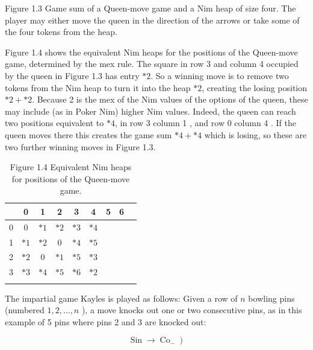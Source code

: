 \documentclass[12pt]{article}
\begin{document}
Figure 1.3 Game sum of a Queen-move game and a Nim heap of size four. The player may either move the queen in the direction of the arrows or take some of the four tokens from the heap.

Figure 1.4 shows the equivalent Nim heaps for the positions of the Queen-move game, determined by the mex rule. The square in row 3 and column 4 occupied by the queen in Figure 1.3 has entry $* 2$. So a winning move is to remove two tokens from the Nim heap to turn it into the heap $* 2$, creating the losing position $* 2+* 2$. Because 2 is the mex of the Nim values of the options of the queen, these may include (as in Poker Nim) higher Nim values. Indeed, the queen can reach two positions equivalent to $* 4$, in row 3 column 1 , and row 0 column 4 . If the queen moves there this creates the game sum $* 4+* 4$ which is losing, so these are two further winning moves in Figure 1.3.

\begin{table}[h]
\begin{center}
\begin{tabular}{l|c|c|c|c|c|c|c|l}
 & \multicolumn{1}{c}{0} & \multicolumn{1}{c}{1} & \multicolumn{1}{c}{2} & \multicolumn{1}{c}{3} & \multicolumn{1}{c}{4} & \multicolumn{1}{c}{5} & \multicolumn{1}{c}{6} &  \\
\hline
0 & 0 & $* 1$ & $* 2$ & $* 3$ & $* 4$ &  &  &  \\
\hline
1 & $* 1$ & $* 2$ & 0 & $* 4$ & $* 5$ &  &  &  \\
\hline
2 & $* 2$ & 0 & $* 1$ & $* 5$ & $* 3$ &  &  &  \\
\hline
3 & $* 3$ & $* 4$ & $* 5$ & $* 6$ & $* 2$ &  &  &  \\
\hline
 &  &  &  &  &  &  &  &  \\
\hline
\end{tabular}
\captionsetup{labelformat=empty}
\caption{Figure 1.4 Equivalent Nim heaps for positions of the Queen-move game.}
\end{center}
\end{table}

The impartial game Kayles is played as follows: Given a row of $n$ bowling pins (numbered $1,2, \ldots, n$ ), a move knocks out one or two consecutive pins, as in this example of 5 pins where pins 2 and 3 are knocked out:


\begin{equation*}
\left.\operatorname{Sin} \rightarrow \operatorname{Co}_{-}\right) \tag{1.22}
\end{equation*}
\end{document}
